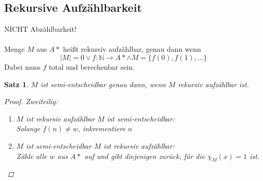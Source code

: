 \documentclass{article}
\begin{document}
\subsection{Rekursive Aufzählbarkeit}
\Rightarrow NICHT Abzählbarkeit!\\\\
Menge $M$ aus $A*$ heißt rekursiv aufzählbar, genau dann wenn
\begin{equation}
    |M|=0 \vee f:\mathbb{N}\rightarrow A* \wedge M=\{f(0), f(1),...\}
\end{equation}
Dabei muss $f$ total und berechenbar sein.\\
\newtheorem*{RaSe}{Satz}
\begin{framed}
    \begin{RaSe}
        $M$ ist semi-entscheidbar genau dann, wenn $M$ rekursiv aufzählbar ist.
        \begin{proof}
            Zweiteilig:
            \begin{enumerate}
                \item $M$ ist rekursiv aufzählbar \Rightarrow $M$ ist semi-entscheidbar:\\
                      Solange $f(n) \not= w$, inkrementiere $n$
                \item $M$ ist semi-entscheidbar \Rightarrow $M$ ist rekursiv aufzählbar:\\
                      Zähle alle $w$ aus $A*$ auf und gibt diejenigen zurück, für die $\chi_M(x) = 1$ ist.
                      \qedhere
            \end{enumerate}
        \end{proof}
    \end{RaSe}
\end{framed}
\end{document}
